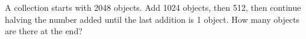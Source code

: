 A collection starts with 2048 objects. Add 1024 objects, then 512, then continue halving the number added until the last addition is 1 object. How many objects are there at the end?
